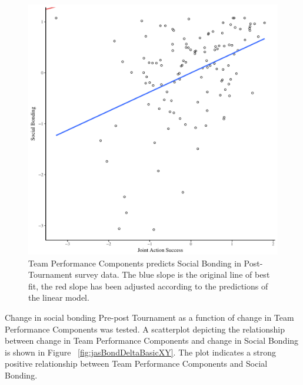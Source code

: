 \begin{CJK}{UTF8}{gbsn}
  \begin{figure}[htbp]
    \centering
  \includegraphics[scale=.5]{images/jasBondModelSlope.pdf}
    \caption{Team Performance Components predicts Social Bonding in Post-Tournament survey data. The blue slope is the original line of best fit, the red slope has been adjusted according to the predictions of the linear model.}
    \label{fig:jasBondModelSlope}
  \end{figure}








Change in social bonding Pre-post Tournament as a function of change in Team Performance Components was tested. A scatterplot depicting the relationship between change in Team Performance Components and change in Social Bonding is shown in Figure ~\ref{fig:jasBondDeltaBasicXY}. The plot indicates a strong positive relationship between Team Performance Components and Social Bonding.


\end{CJK}
